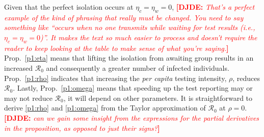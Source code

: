 \documentclass[12pt]{article}
\newcommand{\percap}{\emph{per capita}\xspace}
\newcommand{\Rnum}{\mathcal{R}_0}
\newcommand{\comment}{\showcomment}
\newcommand{\showcomment}[3]{\textcolor{#1}{\textbf{[#2: }\textsl{#3}\textbf{]}}}
\newcommand{\david}[1]{\comment{red}{DJDE}{#1}}
\theoremstyle{definition} %
\begin{document}
Given that the perfect isolation occurs at $\eta_c=\eta_w = 0$,
\david{That's a perfect example of the kind of phrasing that really must be changed.  You need to say something like ``occurs when no one transmits while waiting for test results (i.e., $\eta_c=\eta_w = 0$)''.  It makes the text so much easier to process and doesn't require the reader to keep looking at the table to make sense of what you're saying.}
Prop.~\ref{p1:eta} means that lifting the isolation from awaiting group results in an increased $\Rnum$ and consequently a greater number of infected individuals. Prop.~\ref{p1:rho} indicates that increasing the \percap testing intensity, $\rho$, reduces $\Rnum$. Lastly, Prop.~\ref{p1:omega} means that speeding up the test reporting may or may not reduce $\Rnum$, it will depend on other parameters. It is straightforward to derive \ref{p1:rho} and \ref{p1:omega} from the Taylor approximation of $\Rnum$ at $\rho=0$.
\david{can we gain some insight from the expressions for the partial derivatives in the proposition, as opposed to just their signs?}
 
\end{document}
